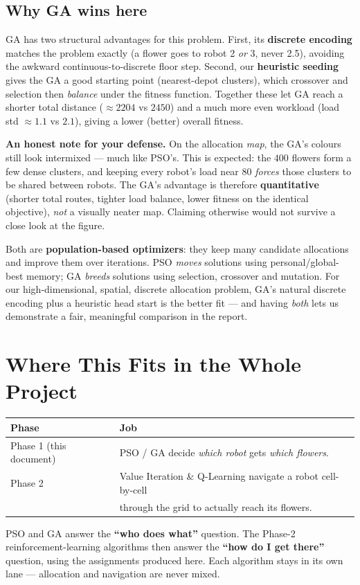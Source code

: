 \documentclass[11pt]{article}
\begin{document}
\subsection{Why GA wins here}
GA has two structural advantages for this problem. First, its \textbf{discrete
encoding} matches the problem exactly (a flower goes to robot 2 \emph{or} 3,
never 2.5), avoiding the awkward continuous-to-discrete floor step. Second, our
\textbf{heuristic seeding} gives the GA a good starting point (nearest-depot
clusters), which crossover and selection then \emph{balance} under the fitness
function. Together these let GA reach a shorter total distance ($\approx 2204$ vs
$2450$) and a much more even workload (load std $\approx 1.1$ vs $2.1$), giving a
lower (better) overall fitness.

\begin{whybox}
\textbf{An honest note for your defense.} On the allocation \emph{map}, the GA's
colours still look intermixed --- much like PSO's. This is expected: the $400$
flowers form a few dense clusters, and keeping every robot's load near $80$
\emph{forces} those clusters to be shared between robots. The GA's advantage is
therefore \textbf{quantitative} (shorter total routes, tighter load balance,
lower fitness on the identical objective), \emph{not} a visually neater map.
Claiming otherwise would not survive a close look at the figure.
\end{whybox}

\begin{tcolorbox}[colback=green!5!white,colframe=green!45!black,title=Take-away]
Both are \textbf{population-based optimizers}: they keep many candidate
allocations and improve them over iterations. PSO \emph{moves} solutions using
personal/global-best memory; GA \emph{breeds} solutions using selection,
crossover and mutation. For our high-dimensional, spatial, discrete allocation
problem, GA's natural discrete encoding plus a heuristic head start is the better
fit --- and having \emph{both} lets us demonstrate a fair, meaningful comparison
in the report.
\end{tcolorbox}

\section{Where This Fits in the Whole Project}

\begin{center}
\begin{tabular}{@{}ll@{}}
\toprule
\textbf{Phase} & \textbf{Job} \\
\midrule
Phase 1 (this document) & PSO / GA decide \emph{which robot} gets \emph{which flowers}. \\
Phase 2 & Value Iteration \& Q-Learning navigate a robot cell-by-cell \\
         & through the grid to actually reach its flowers. \\
\bottomrule
\end{tabular}
\end{center}

\noindent
PSO and GA answer the \textbf{``who does what''} question. The Phase-2
reinforcement-learning algorithms then answer the \textbf{``how do I get
there''} question, using the assignments produced here. Each algorithm stays in
its own lane --- allocation and navigation are never mixed.
\end{document}
